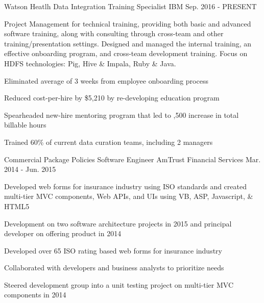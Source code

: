 \begin{cventries}
  \cventry
    {Watson Heatlh} %
    {Data Integration Training Specialist} %
    {IBM} %
    {Sep. 2016 - PRESENT} %
    {
      \begin{cvparagraph}
        Project Management for technical training, providing both basic and advanced software training, along with consulting through cross-team and other training/presentation settings.  Designed and managed the internal training, an effective onboarding program, and cross-team development training.  Focus on HDFS technologies: Pig, Hive \& Impala, Ruby \& Java.  
      \end{cvparagraph}
      \begin{cvitems} %
        \item {Eliminated average of 3 weeks from employee onboarding process}
        \item {Reduced cost-per-hire by \$5,210 by re-developing education program}
        \item {Spearheaded new-hire mentoring program that led to ,500 increase in total billable hours}
        \item {Trained 60\% of current data curation teams, including 2 managers}
      \end{cvitems}
    }

  \cventry
    {Commercial Package Policies} %
    {Software Engineer} %
    {AmTrust Financial Services} %
    {Mar. 2014 - Jun. 2015} %
    {
      \begin{cvparagraph}
        Developed web forms for insurance industry using ISO standards and created multi-tier MVC components, Web APIs, and UIs using VB, ASP, Javascript, \& HTML5
      \end{cvparagraph}
      \begin{cvitems} %
        \item {Development on two software architecture projects in 2015 and principal developer on offering product in 2014}
        \item {Developed over 65 ISO rating based web forms for insurance industry}
        \item {Collaborated with developers and business analysts to prioritize needs}
        \item {Steered development group into a unit testing project on multi-tier MVC components in 2014}
      \end{cvitems}
    }


\end{cventries}
